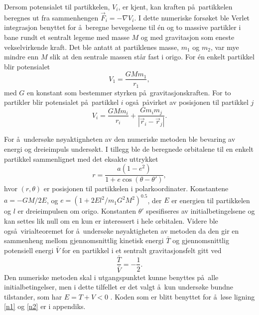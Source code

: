 \documentclass[5p]{elsarticle}        %
\begin{document}
Dersom potensialet til partikkelen, $V_i$, er kjent, kan kraften p\aa \ partikkelen beregnes ut fra sammenhengen $\vec{F}_i=-\nabla V_i$. I dette numeriske fors\o ket ble Verlet integrasjon benyttet for \aa \ beregne bevegelsene til \'{e}n og to massive partikler i bane rundt et sentralt legeme med masse $M$ og med gravitasjon som eneste vekselvirkende kraft. Det ble antatt at partiklenes masse, $m_1$ og $m_2$, var mye mindre enn $M$ slik at den sentrale massen st\aa r fast i origo. For \'{e}n enkelt partikkel blir potensialet
\begin{equation}
V_1 = \frac{GMm_1}{r_1},
\end{equation}
med $G$ en konstant som bestemmer styrken p\aa \ gravitasjonskraften. For to partikler blir potensialet p\aa \ partikkel $i$ ogs\aa \ p\aa virket av posisjonen til partikkel $j$
\begin{equation}
V_i = \frac{GMm_i}{r_i} + \frac{Gm_im_j}{|\vec{r}_i-\vec{r}_j|}.
\end{equation}

For \aa \ unders\o ke n\o yaktignheten av den numeriske metoden ble bevaring av energi og dreieimpuls unders\o kt. I tillegg ble de beregnede orbitalene til en enkelt partikkel sammenlignet med det eksakte uttrykket \cite{goldstein}
\begin{equation}
r = \frac{a(1-e^2)}{1+e\cos{(\theta - \theta')}},
\label{exact}
\end{equation}
hvor $(r,\theta)$ er posisjonen til partikkelen i polarkoordinater. Konstantene $a = -GM/2E$, og $e=(1+2El^2/m_1G^2M^2)^{0.5}$, der $E$ er energien til partikkelen og $l$ er dreieimpulsen om origo. Konstanten $\theta'$ spesifiseres av initialbetingelsene og kan settes lik null om en kun er interessert i hele orbitalen. Videre ble ogs\aa \ virialteoremet for \aa \ unders\o ke n\o yaktigheten av metoden da den gir en sammenheng mellom gjennomsnittlig kinetisk energi $\bar{T}$ og gjennomsnittlig potensiell energi $\bar{V}$ for en partikkel i et sentralt gravitasjonsfelt gitt ved\cite{goldstein}
\begin{equation}
\frac{\bar{T}}{\bar{V}}=-\frac{1}{2}.
\label{virial}
\end{equation}
Den numeriske metoden skal i utgangspunktet kunne benyttes p\aa \ alle initialbetingelser, men i dette tilfellet er det valgt \aa \ kun unders\o ke bundne tilstander, som har $E = T + V < 0$ \cite{goldstein}. Koden som er blitt benyttet for \aa \ l\o se ligning \eqref{n1} og \eqref{n2} er i appendiks.
\end{document}
